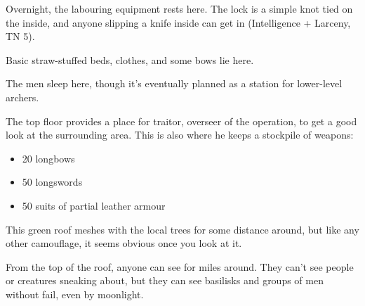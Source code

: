 

Overnight, the labouring equipment rests here.
The lock is a simple knot tied on the inside, and anyone slipping a knife inside can get in (Intelligence + Larceny, TN 5).


Basic straw-stuffed beds, clothes, and some bows lie here.


The men sleep here, though it's eventually planned as a station for lower-level archers.


The top floor provides a place for \gls{traitor}, overseer of the operation, to get a good look at the surrounding area.
This is also where he keeps a stockpile of weapons:

\begin{itemize}

  \item{20 longbows}
  \item{50 longswords}
  \item{50 suits of partial leather armour}

\end{itemize}


This green roof meshes with the local trees for some distance around, but like any other camouflage, it seems obvious once you look at it.

From the top of the roof, anyone can see for miles around.
They can't see people or creatures sneaking about, but they can see basilisks and groups of men without fail, even by moonlight.



